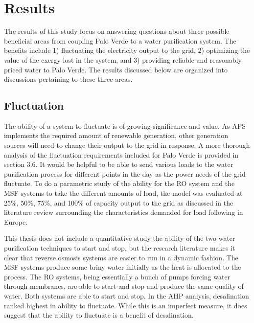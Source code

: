 \section{Results}

The results of this study focus on answering questions about three possible beneficial areas from coupling Palo Verde to a water purification system. The benefits include 1) fluctuating the electricity output to the grid, 2) optimizing the value of the exergy lost in the system, and 3) providing reliable and reasonably priced water to Palo Verde.  The results discussed below are organized into discussions pertaining to these three areas.


\subsection{Fluctuation}
The ability of a system to fluctuate is of growing significance and value. As APS implements the required amount of renewable generation, other generation sources will need to change their output to the grid in response. A more thorough analysis of the fluctuation requirements included for Palo Verde is provided in section 3.6. It would be helpful to be able to send various loads to the water purification process for different points in the day as the power needs of the grid fluctuate. To do a parametric study of the ability for the RO system and the MSF systems to take the different amounts of load, the model was evaluated at 25\%, 50\%, 75\%, and 100\% of capacity output to the grid as discussed in the literature review surrounding the characteristics demanded for load following in Europe.

This thesis does not include a quantitative study the ability of the two water purification techniques to start and stop, but the research literature makes it clear that reverse osmosis systems are easier to run in a dynamic fashion.  The MSF systems produce some briny water initially as the heat is allocated to the process.  The RO systems, being essentially a bunch of pumps forcing water through membranes, are able to start and stop and produce the same quality of water.  Both systems are able to start and stop.  In the AHP analysis, desalination ranked highest in ability to fluctuate. While this is an imperfect measure, it does suggest that the ability to fluctuate is a benefit of desalination.

